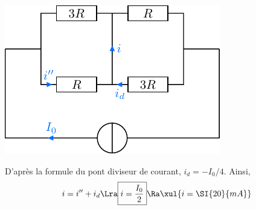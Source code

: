 \documentclass[a4paper, 10pt, garamond, oneside]{book}
\begin{document}
{\begin{enumerate}
\begin{minipage}[t]{0.4\linewidth}
			\begin{center}
				\includegraphics[width=\linewidth]{diplin_q8}
			\end{center}
		\end{minipage}
		 D'après la formule du pont diviseur de courant, $i_d=-I_0/4$.
		Ainsi,
		\[
			i = i'' + i_d
			\Lra
			\boxed{i = \frac{I_0}{2}}
			\Ra
			\xul{i = \SI{20}{mA}}
		\]
	\end{enumerate}
}
\end{document}
